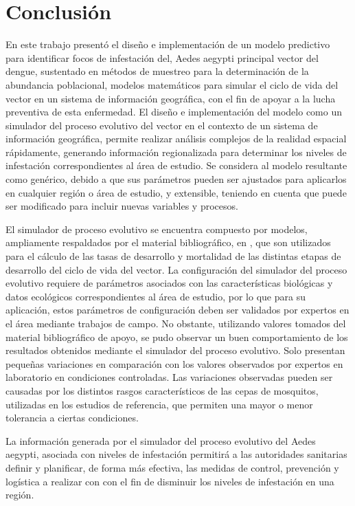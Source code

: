 \section{Conclusión}
En este trabajo presentó el diseño e implementación de un modelo predictivo para identificar focos
de infestación del, Aedes aegypti principal vector del dengue, sustentado en métodos de muestreo
para la determinación de la abundancia poblacional, modelos matemáticos para simular el ciclo de
vida del vector en un sistema de información geográfica, con el fin de apoyar a la lucha
preventiva de esta enfermedad. El diseño e implementación del modelo como un simulador del proceso
evolutivo del vector en el contexto de un sistema de información geográfica, permite realizar
análisis complejos de la realidad espacial rápidamente, generando información regionalizada para
determinar los niveles de infestación correspondientes al área de estudio. Se considera al modelo
resultante como genérico, debido a que sus parámetros pueden ser ajustados para aplicarlos en
cualquier región o área de estudio, y extensible, teniendo en cuenta que puede ser modificado para
incluir nuevas variables y procesos.

El simulador de proceso evolutivo se encuentra compuesto por modelos, ampliamente respaldados por
el material bibliográfico, en \cite{sharpe1977reaction, focks1993dynamic, schoolfield1981non, otero2006stochastic, rueda1990temperature}, que son utilizados para el cálculo de las tasas de
desarrollo y mortalidad de las distintas etapas de desarrollo del ciclo de vida del vector. La
configuración del simulador del proceso evolutivo requiere de parámetros asociados con las
características biológicas y datos ecológicos correspondientes al área de estudio, por lo que para
su aplicación, estos parámetros de configuración deben ser validados por expertos en el área
mediante trabajos de campo. No obstante, utilizando valores tomados del material bibliográfico de
apoyo, se pudo observar un buen comportamiento de los resultados obtenidos mediante el simulador
del proceso evolutivo. Solo presentan pequeñas variaciones en comparación con los valores
observados por expertos en laboratorio en condiciones controladas. Las variaciones observadas
pueden ser causadas por los distintos rasgos característicos de las cepas de mosquitos, utilizadas
en los estudios de referencia, que permiten una mayor o menor tolerancia a ciertas condiciones.

La información generada por el simulador del proceso evolutivo del Aedes aegypti, asociada con
niveles de infestación permitirá a las autoridades sanitarias definir y planificar, de forma más
efectiva, las medidas de control, prevención y logística a realizar con con el fin de disminuir
los niveles de infestación en una región.
